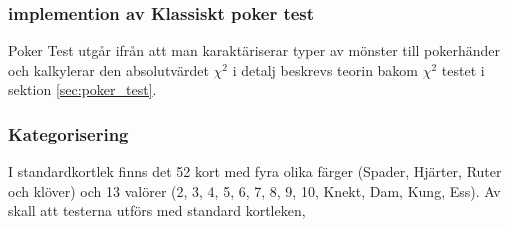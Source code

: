 \documentclass[swedish,a4paper]{article}
\begin{document}
\subsubsection{implemention av Klassiskt poker test}
Poker Test utgår ifrån att man karaktäriserar typer av mönster till 
pokerhänder och kalkylerar  den absolutvärdet $\chi^2$ i detalj beskrevs
teorin bakom $\chi^2$ testet i sektion
\ref{sec:poker_test}. 

\subsubsection*{Kategorisering}
I standardkortlek finns det 52 kort med fyra olika 
färger (Spader, Hjärter, Ruter och klöver) och 13 valörer 
(2, 3, 4, 5, 6, 7, 8, 9, 10, Knekt, Dam, Kung, Ess).
Av skall att testerna utförs med standard kortleken,
\end{document}
